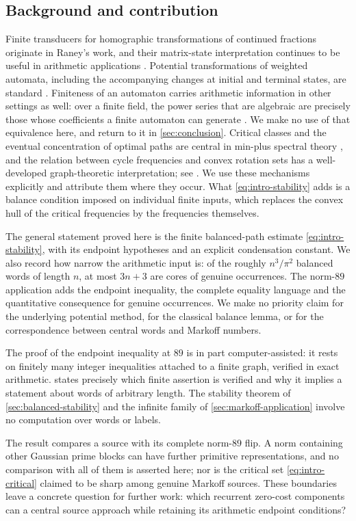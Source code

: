 \subsection{Background and contribution}

Finite transducers for homographic transformations of continued fractions
originate in Raney's work, and their matrix-state interpretation continues
to be useful in arithmetic applications
\cite{Raney1973,DongDupontODorneyWaitkus2025}. Potential transformations of
weighted automata, including the accompanying changes at initial and
terminal states, are standard \cite{Mohri2009}. Finiteness of an automaton
carries arithmetic information in other settings as well: over a finite
field, the power series that are algebraic are precisely those whose
coefficients a finite automaton can generate \cite{ChristolKamaeMendesFranceRauzy1980}.
We make no use of that equivalence here, and return to it in
\cref{sec:conclusion}. Critical classes and the
eventual concentration of optimal paths are central in min-plus spectral
theory \cite{Quadrat1997}, and the relation between cycle frequencies and
convex rotation sets has a well-developed graph-theoretic interpretation;
see \cite[Section 3]{BochiZhang2016}. We use these mechanisms explicitly and
attribute them where they occur. What \eqref{eq:intro-stability} adds is a
balance condition imposed on individual finite inputs, which replaces the
convex hull of the critical frequencies by the frequencies themselves.

The general statement proved here is the finite balanced-path estimate
\eqref{eq:intro-stability}, with its endpoint hypotheses and an explicit
condensation constant. We also record how narrow the arithmetic input is:
of the roughly $n^3/\pi^2$ balanced words of length $n$, at most $3n+3$ are
cores of genuine occurrences. The norm-$89$ application adds the endpoint
inequality, the complete equality language and the quantitative consequence
for genuine occurrences. We make no priority claim for the underlying
potential method, for the classical balance lemma, or for the
correspondence between central words and Markoff numbers.

The proof of the endpoint inequality at $89$ is in part computer-assisted:
it rests on finitely many integer inequalities attached to a finite graph,
verified in exact arithmetic.  states precisely which
finite assertion is verified and why it implies a statement about words of
arbitrary length. The stability theorem of \cref{sec:balanced-stability} and
the infinite family of \cref{sec:markoff-application} involve no computation
over words or labels.

The result compares a source with its complete norm-$89$ flip. A norm
containing other Gaussian prime blocks can have further primitive
representations, and no comparison with all of them is asserted here; nor
is the critical set \eqref{eq:intro-critical} claimed to be sharp among
genuine Markoff sources. These boundaries leave a concrete question for
further work: which recurrent zero-cost components can a central source
approach while retaining its arithmetic endpoint conditions?
